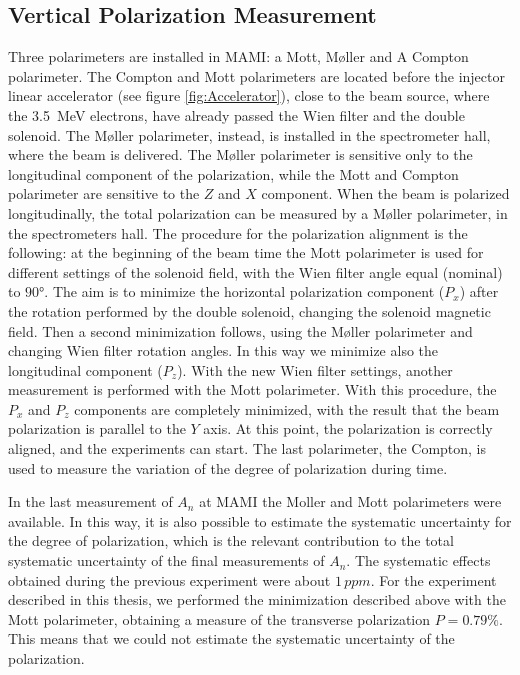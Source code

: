 \subsection{Vertical Polarization Measurement}
Three polarimeters are installed in MAMI: a Mott, M\o ller and A Compton polarimeter. The Compton and Mott polarimeters are located before the injector linear accelerator (see figure \ref{fig:Accelerator}), close to the beam source, where the \SI{3.5}{\mega \electronvolt} electrons, have already passed the Wien filter and the double solenoid. The M\o ller polarimeter, instead, is installed in the spectrometer hall, where the beam is delivered. The M\o ller polarimeter is sensitive only to the longitudinal component of the polarization, while the Mott and Compton polarimeter are sensitive to the $Z$ and $X$ component. 
When the beam is polarized longitudinally, the total polarization can be measured by a M\o ller polarimeter, in the spectrometers hall. The procedure for the polarization alignment is the following: at the beginning of the beam time the Mott polarimeter is used for different settings of the solenoid field, with the Wien filter angle equal (nominal) to $\ang{90}$. The aim is to minimize the horizontal polarization component ($P_{x}$) after the rotation performed by the double solenoid, changing the solenoid magnetic field. Then a second minimization follows, using the M\o ller polarimeter and changing Wien filter  rotation angles. In this way we minimize also the longitudinal component ($P_{z}$). With the new Wien filter settings, another measurement is performed with the Mott polarimeter. With this procedure, the $P_{x}$ and $P_{z}$ components are completely minimized, with the result that the beam polarization is parallel to the $Y$ axis.
At this point, the polarization is correctly aligned, and the experiments can start. The last polarimeter, the Compton, is used to measure the variation of the degree of polarization during time. 

In the last measurement of $A_{n}$ at MAMI \cite{Esser:2018vdp} the Moller and Mott polarimeters were available. In this way, it is also possible to estimate the systematic uncertainty for the degree of polarization, which is the relevant contribution to the total systematic uncertainty of the final measurements of $A_{n}$. The systematic effects obtained during the previous experiment were about $1 \, ppm$. For the experiment described in this thesis, we performed the minimization described above with the Mott polarimeter, obtaining a measure of the transverse polarization $P = 0.79\%$. This means that we could not estimate the systematic uncertainty of the polarization.

